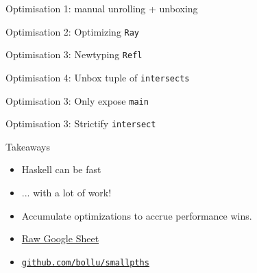 \documentclass[8pt]{beamer}
\newcommand{\Ray}{\texttt{Ray}}
\newcommand{\Refl}{\texttt{Refl}}
\newcommand{\main}{\texttt{main}}
\newcommand{\intersect}{\texttt{intersect}}
\newcommand{\intersects}{\texttt{intersects}}
\begin{document}
\begin{frame}[fragile]{Optimisation 1: manual unrolling + unboxing }
\end{frame}

\begin{frame}[fragile]{Optimisation 2: Optimizing \Ray}
\end{frame}

\begin{frame}[fragile]{Optimisation 3: Newtyping \Refl}
\end{frame}

\begin{frame}[fragile]{Optimisation 4: Unbox tuple of \intersects}
\end{frame}


\begin{frame}[fragile]{Optimisation 3: Only expose \main}
\end{frame}


\begin{frame}[fragile]{Optimisation 3: Strictify \intersect}
\end{frame}




\begin{frame}[fragile]{Takeaways}
\pause
\begin{itemize}
\item Haskell can be fast \pause
\item ... with a lot of work! \pause
\item Accumulate optimizations to accrue performance wins. \pause
\item \href{https://docs.google.com/spreadsheets/d/1YhZlDRGvnCtN8UQf_0ItmgRWI9MhL21HDTlBEKqgWHc/edit#gid=0}{Raw Google Sheet}
\item \href{https://github.com/bollu/smallpths}{\texttt{github.com/bollu/smallpths}}
\end{itemize}
\end{frame}
\end{document}
